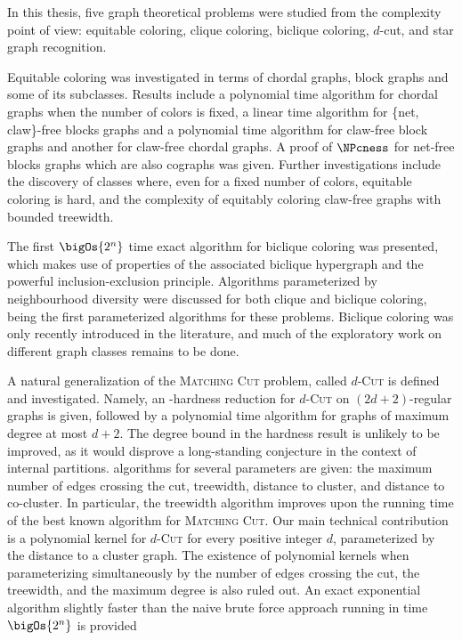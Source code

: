 In this thesis, five graph theoretical problems were studied from the complexity point of view: equitable coloring, clique coloring, biclique coloring, $d$-cut, and star graph recognition.

Equitable coloring was investigated in terms of chordal graphs, block graphs and some of its subclasses.
Results include a polynomial time algorithm for chordal graphs when the number of colors is fixed, a linear time algorithm for \{net, claw\}-free blocks graphs and a polynomial time algorithm for claw-free block graphs and another for claw-free chordal graphs.
A proof of $\NPcness$ for net-free blocks graphs which are also cographs was given.
Further investigations include the discovery of classes where, even for a fixed number of colors, equitable coloring is hard, and the complexity of equitably coloring claw-free graphs with bounded treewidth.

The first $\bigOs{2^n}$ time exact algorithm for biclique coloring was presented, which makes use of properties of the associated biclique hypergraph and the powerful inclusion-exclusion principle.
Algorithms parameterized by neighbourhood diversity were discussed for both clique and biclique coloring, being the first parameterized algorithms for these problems.
Biclique coloring was only recently introduced in the literature, and much of the exploratory work on different graph classes remains to be done.

A natural generalization of the \textsc{Matching Cut} problem, called \textsc{$d$-Cut} is defined and investigated.
Namely, an \NP-hardness reduction for \textsc{$d$-Cut} on $(2d+2)$-regular graphs is given, followed by a polynomial time algorithm for graphs of maximum degree at most $d+2$.
The degree bound in the hardness result is unlikely to be improved, as it would disprove a long-standing conjecture in the context of internal partitions.
\FPT algorithms for several parameters are given: the maximum number of edges crossing the cut, treewidth, distance to cluster, and distance to co-cluster. In particular, the treewidth algorithm improves upon the running time of the best known algorithm for \textsc{Matching Cut}. Our main technical contribution is a polynomial kernel for \textsc{$d$-Cut} for every positive integer $d$, parameterized by the distance to a cluster graph. The existence of polynomial kernels when parameterizing simultaneously by the number of edges crossing the cut, the treewidth, and the maximum degree is also ruled out.
An exact exponential algorithm slightly faster than the naive brute force approach running in time $\bigOs{2^n}$ is provided

